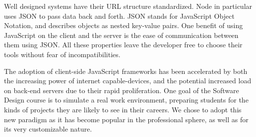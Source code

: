 \documentclass[12pt]{article}
\begin{document}
Well designed systems have their URL structure standardized. Node in particular uses JSON to pass data back and forth. JSON stands for JavaScript Object Notation, and describes objects as nested key-value pairs. One benefit of using JavaScript on the client and the server is the ease of communication between them using JSON. All these properties leave the developer free to choose their tools without fear of incompatibilities. 

The adoption of client-side JavaScript frameworks has been accelerated by both the increasing power of internet capable-devices, and the potential increased load on back-end servers due to their rapid proliferation. One goal of the Software Design course is to simulate a real work environment, preparing students for the kinds of projects they are likely to see in their careers. We chose to adopt this new paradigm as it has become popular in the professional sphere, as well as for its very customizable nature.
\end{document}
